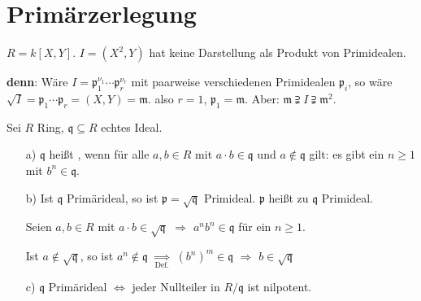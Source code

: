 \section{Primärzerlegung}

\begin{nnBsp}
$R = k[X,Y]$. $I = (X^2, Y)$ hat keine Darstellung als Produkt von Primidealen.

\textbf{denn}: Wäre $I = \mathfrak{p}_1^{\nu_1} \cdots \mathfrak{p}_r^{\nu_r}$ mit paarweise verschiedenen Primidealen $\mathfrak{p}_i$, so wäre $\sqrt{I} = \mathfrak{p}_1 \cdots \mathfrak{p}_r = (X,Y) = \mathfrak{m}$. also $r = 1$, $\mathfrak{p}_1 = \mathfrak{m}$. Aber: $\mathfrak{m} \supsetneqq I \supsetneqq \mathfrak{m}^2$.

\end{nnBsp}

\begin{DefBem}
Sei $R$ Ring, $\mathfrak{q} \subseteq R$ echtes Ideal.

\begin{enumerate}
\item[a)] $\mathfrak{q}$ heißt , wenn für alle $a,b \in R$ mit $a \cdot b \in \mathfrak{q}$ und $a \notin \mathfrak{q}$ gilt: es gibt ein $n \geq 1$ mit $b^n \in \mathfrak{q}$.

\item[b)] Ist $\mathfrak{q}$ Primärideal, so ist $\mathfrak{p} = \sqrt{\mathfrak{q}}$ Primideal. $\mathfrak{p}$ heißt zu $\mathfrak{q}$  Primideal.

\begin{Bew}
Seien $a, b \in R$ mit $a \cdot b \in \sqrt{\mathfrak{q}}$ $\Rightarrow$ $a^n b^n \in \mathfrak{q}$ für ein $n \geq 1$.

Ist $a \notin \sqrt{\mathfrak{q}}$, so ist $a^n \notin \mathfrak{q}$ $\underset{\text{Def.}}{\Rightarrow}$ $(b^n)^m \in \mathfrak{q}$ $\Rightarrow$ $b \in \sqrt{\mathfrak{q}}$
\end{Bew}

\item[c)] $\mathfrak{q}$ Primärideal $\Leftrightarrow$ jeder Nullteiler in $R / \mathfrak{q}$ ist nilpotent.

\end{enumerate}
\end{DefBem}

